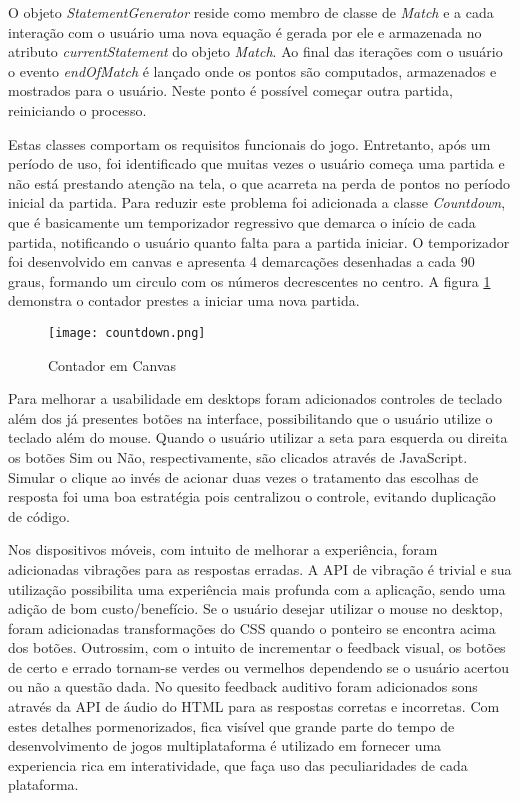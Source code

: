 O objeto \textit{StatementGenerator} reside como membro de classe de
\textit{Match} e a cada interação com o usuário uma nova equação
é gerada por ele e armazenada no atributo \textit{currentStatement}
do objeto \textit{Match}. Ao final das iterações com o usuário o
evento \textit{endOfMatch} é lançado onde os pontos são computados,
armazenados e mostrados para o usuário. Neste ponto é possível
começar outra partida, reiniciando o processo.

Estas classes comportam os requisitos funcionais do jogo. Entretanto,
após um período de uso, foi identificado que muitas vezes o usuário
começa uma partida e não está prestando atenção na tela, o
que acarreta na perda de pontos no período inicial da partida. Para
reduzir este problema foi adicionada a classe \textit{Countdown},
que é basicamente um temporizador regressivo que demarca o início
de cada partida, notificando o usuário quanto falta para a partida
iniciar. O temporizador foi desenvolvido em canvas e apresenta 4
demarcações desenhadas a cada 90 graus, formando um circulo com
os números decrescentes no centro. A figura
\ref{fig:counter} demonstra o contador prestes a iniciar uma nova
partida.

\begin{figure}[H]
    \centering
    \texttt{[image: countdown.png]}
	\caption{Contador em Canvas}
    \label{fig:counter}
\end{figure}

Para melhorar a usabilidade em desktops foram adicionados controles de
teclado além dos já presentes botões na interface, possibilitando que
o usuário utilize o teclado além do mouse. Quando o usuário utilizar
a seta para esquerda ou direita os botões Sim ou Não, respectivamente,
são clicados através de JavaScript. Simular o clique ao invés de
acionar duas vezes o tratamento das escolhas de resposta foi uma boa
estratégia pois centralizou o controle, evitando duplicação de
código.

Nos dispositivos móveis, com intuito de melhorar a experiência, foram
adicionadas vibrações para as respostas erradas. A API de vibração
é trivial e sua utilização possibilita uma experiência mais
profunda com a aplicação, sendo uma adição de bom custo/benefício.
Se o usuário desejar utilizar o mouse no desktop, foram adicionadas
transformações do CSS quando o ponteiro se encontra acima dos
botões. Outrossim, com o intuito de incrementar o feedback visual, os botões de certo e errado
tornam-se verdes ou vermelhos dependendo se o usuário acertou ou não
a questão dada. No quesito feedback auditivo foram adicionados sons
através da API de áudio do HTML para as respostas corretas e incorretas. Com estes
detalhes pormenorizados, fica visível que grande parte do tempo de
desenvolvimento de jogos multiplataforma é utilizado em fornecer uma
experiencia rica em interatividade, que faça uso das peculiaridades de
cada plataforma.

